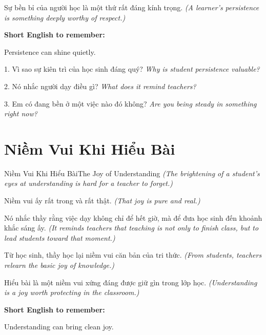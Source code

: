 \begin{baihoc}
Sự bền bỉ của người học là một thứ rất đáng kính trọng.
\textit{(A learner's persistence is something deeply worthy of respect.)}
\end{baihoc}

\begin{ghinhoanh}
\textbf{Short English to remember:}

Persistence can shine quietly.

\end{ghinhoanh}

\begin{tuhocnhanh}
1. Vì sao sự kiên trì của học sinh đáng quý? \textit{Why is student persistence valuable?}

2. Nó nhắc người dạy điều gì? \textit{What does it remind teachers?}

3. Em có đang bền ở một việc nào đó không? \textit{Are you being steady in something right now?}
\end{tuhocnhanh}
\ngancach

\section{Niềm Vui Khi Hiểu Bài}
\begin{truyen}{Niềm Vui Khi Hiểu Bài}{The Joy of Understanding}
\textit{(The brightening of a student's eyes at understanding is hard for a teacher to forget.)}

Niềm vui ấy rất trong và rất thật.
\textit{(That joy is pure and real.)}

Nó nhắc thầy rằng việc dạy không chỉ để hết giờ, mà để đưa học sinh đến khoảnh khắc sáng ấy.
\textit{(It reminds teachers that teaching is not only to finish class, but to lead students toward that moment.)}

Từ học sinh, thầy học lại niềm vui căn bản của tri thức.
\textit{(From students, teachers relearn the basic joy of knowledge.)}
\end{truyen}

\begin{baihoc}
Hiểu bài là một niềm vui xứng đáng được giữ gìn trong lớp học.
\textit{(Understanding is a joy worth protecting in the classroom.)}
\end{baihoc}

\begin{ghinhoanh}
\textbf{Short English to remember:}

Understanding can bring clean joy.

\end{ghinhoanh}

